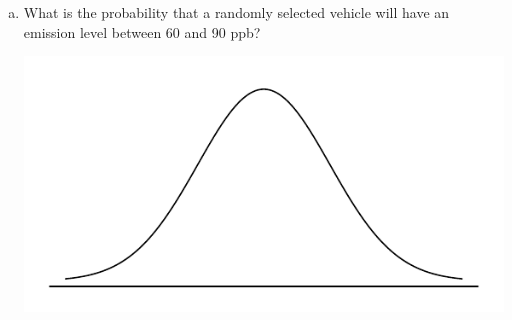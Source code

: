 \documentclass[fleqn, 11pt]{article}
\begin{document}
\begin{enumerate}[(a)]
\item What is the probability that a randomly selected vehicle will have an emission level between 60 and 90 ppb?

\includegraphics[scale=0.6]{figure/norm_draw.pdf}
\end{enumerate}  
\clearpage
\end{document}
